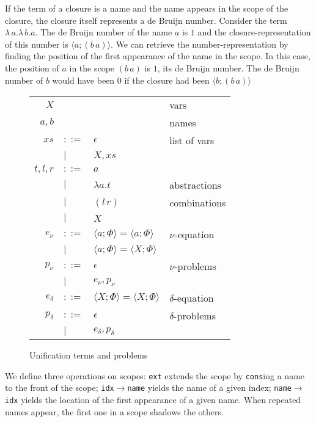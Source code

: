 \documentclass{easychair}
\newcommand{\clos}[2] {
\langle #1; #2 \rangle
}
\newcommand{\app}[2] {
(#1\, #2)
}
\begin{document}
If the term of a closure is a name and the name appears in the scope
of the closure,
the closure itself represents a de Bruijn number.
Consider the term
$\lambda\,a.\lambda\,b.a$. The de Bruijn number of the name $a$ is $1$
and the closure-representation of this number is $\clos{a}{(b\,a)}$.
We can retrieve the number-representation by finding the position of
the first appearance of the name in the scope. In this case, the
position of $a$ in the scope $(b\,a)$ is $1$, its de Bruijn
number. The de Bruijn number of $b$ would have been $0$
if the closure had been $\clos{b}{(b\,a)}$
\begin{wrapfigure}{r}{0.5\textwidth}
\caption{Unification terms and problems\label{table:new-terms}}
\begin{tabular}{r l l l}
  \\
$X$ & & & vars \\
$a,b$ & & & names \\
$xs$ & $::=$ & $\epsilon$& list of vars \\
& $|$&$X,xs$ &\\
$t,l,r$ & $::=$ & $a$ & \\
& $|$ & $\lambda a.t$ & abstractions \\
& $|$ & $\app{l}{r}$ & combinations \\
& $|$ & $X$ & \\
$e_\nu$& $::=$ & $\clos{a}{\Phi} = \clos{a}{\Phi}$ & $\nu$-equation \\
 & $|$ &$\clos{a}{\Phi} = \clos{X}{\Phi}$ \\
$p_\nu$& $::=$ & $\epsilon$ & $\nu$-problems \\
 & $|$ & $e_\nu, p_\nu$ \\
$e_\delta$& $::=$& $\clos{X}{\Phi} = \clos{X}{\Phi}$ & $\delta$-equation \\
$p_\delta$& $::=$ & $\epsilon$ & $\delta$-problems \\
 & $|$ & $e_\delta, p_\delta$
\end{tabular}
\end{wrapfigure}
We define three operations on scopes: \texttt{ext}
extends the scope by \texttt{cons}ing a name to the front of the scope;
\texttt{idx$\rightarrow$name} yields the name of a given index;
\texttt{name$\rightarrow$idx} yields the location of the first
appearance of a given name.
When repeated names appear, the
first one in a scope shadows the others.
\end{document}
